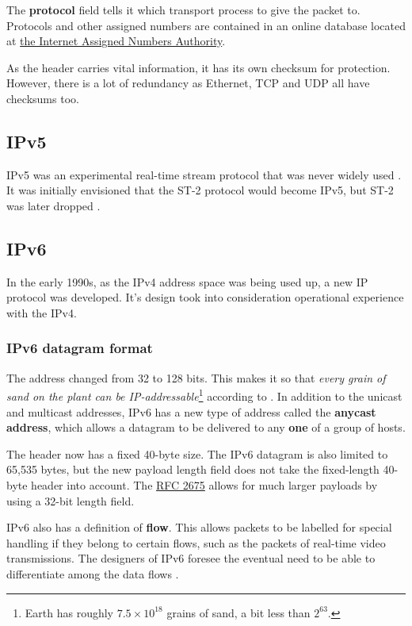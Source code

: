 \documentclass[12pt, oneside]{book}
\begin{document}
The \textbf{protocol} field tells it which transport process to give the packet to.
Protocols and other assigned numbers are contained in an online database located at \href{https://www.iana.org}{the Internet Assigned Numbers Authority}.

As the header carries vital information, it has its own checksum for protection. However, there is a lot of redundancy as Ethernet, TCP and UDP all have checksums too.

\subsection{IPv5}

IPv5 was an experimental real-time stream protocol that was never widely used \cite{communication-networks-leon-garcia-2000}.
It was initially envisioned that the ST-2 protocol would become IPv5, but ST-2 was later dropped \cite{computer-networking-kurose-2012}.

\subsection{IPv6}
In the early 1990s, as the IPv4 address space was being used up, a new IP protocol was developed.
It's design took into consideration operational experience with the IPv4.

\subsubsection{IPv6 datagram format}

The address changed from 32 to 128 bits.
This makes it so that \textit{every grain of sand on the plant can be IP-addressable}\footnote{Earth has roughly \(7.5 \times 10^{18}\) grains of sand, a bit less than \(2^{63}\).} according to \cite{computer-networking-kurose-2012}.
In addition to the unicast and multicast addresses, IPv6 has a new type of address called the \textbf{anycast address}, which allows a datagram to be delivered to any \textbf{one} of a group of hosts.

The header now has a fixed 40-byte size.
The IPv6 datagram is also limited to 65,535 bytes, but the new payload length field does not take the fixed-length 40-byte header into account.
The \href{https://tools.ietf.org/html/rfc2675}{RFC 2675} allows for much larger payloads by using a 32-bit length field.

IPv6 also has a definition of \textbf{flow}. This allows packets to be labelled for special handling if they belong to certain flows, such as the packets of real-time video transmissions.
The designers of IPv6 foresee the eventual need to be able to differentiate among the data flows \cite{computer-networking-kurose-2012}.
\end{document}
